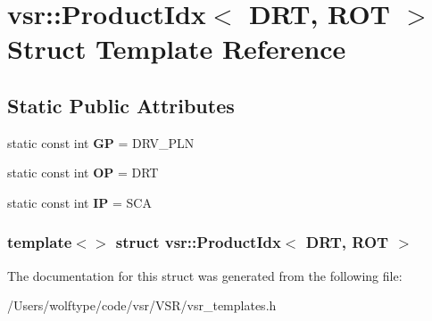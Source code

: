 \hypertarget{structvsr_1_1_product_idx_3_01_d_r_t_00_01_r_o_t_01_4}{\section{vsr\-:\-:Product\-Idx$<$ D\-R\-T, R\-O\-T $>$ Struct Template Reference}
\label{structvsr_1_1_product_idx_3_01_d_r_t_00_01_r_o_t_01_4}
}
\subsection*{Static Public Attributes}
\begin{DoxyCompactItemize}
\item 
\hypertarget{structvsr_1_1_product_idx_3_01_d_r_t_00_01_r_o_t_01_4_ac27264532e42303601240faa2ee68942}{static const int {\bfseries G\-P} = D\-R\-V\-\_\-\-P\-L\-N}\label{structvsr_1_1_product_idx_3_01_d_r_t_00_01_r_o_t_01_4_ac27264532e42303601240faa2ee68942}

\item 
\hypertarget{structvsr_1_1_product_idx_3_01_d_r_t_00_01_r_o_t_01_4_a7ae694a1332fba2d0f34edbf0ee25f36}{static const int {\bfseries O\-P} = D\-R\-T}\label{structvsr_1_1_product_idx_3_01_d_r_t_00_01_r_o_t_01_4_a7ae694a1332fba2d0f34edbf0ee25f36}

\item 
\hypertarget{structvsr_1_1_product_idx_3_01_d_r_t_00_01_r_o_t_01_4_ad4a3a6483c7e436a2944212133f81b0c}{static const int {\bfseries I\-P} = S\-C\-A}\label{structvsr_1_1_product_idx_3_01_d_r_t_00_01_r_o_t_01_4_ad4a3a6483c7e436a2944212133f81b0c}

\end{DoxyCompactItemize}
\subsubsection*{template$<$$>$ struct vsr\-::\-Product\-Idx$<$ D\-R\-T, R\-O\-T $>$}



The documentation for this struct was generated from the following file\-:\begin{DoxyCompactItemize}
\item 
/\-Users/wolftype/code/vsr/\-V\-S\-R/vsr\-\_\-templates.\-h\end{DoxyCompactItemize}
